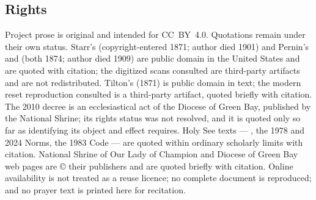 \subsection*{Rights}

Project prose is original and intended for CC~BY~4.0. Quotations remain
under their own status. Starr's  (copyright-entered
1871; author died 1901) and Pernin's 
and  (both 1874; author died 1909) are
public domain in the United States and are quoted with citation; the
digitized scans consulted are third-party artifacts and are not
redistributed. Tilton's  (1871) is public domain in text;
the modern reset reproduction consulted is a third-party artifact,
quoted briefly with citation. The 2010 decree is an ecclesiastical act
of the Diocese of Green Bay, published by the National Shrine; its
rights status was not resolved, and it is quoted only so far as
identifying its object and effect requires. Holy See texts ---
, the 1978 and 2024 Norms, the 1983 Code --- are
quoted within ordinary scholarly limits with citation. National Shrine
of Our Lady of Champion and Diocese of Green Bay web pages are
\copyright{} their publishers and are quoted briefly with citation.
Online availability is not treated as a reuse licence; no complete
document is reproduced; and no prayer text is printed here for
recitation.
